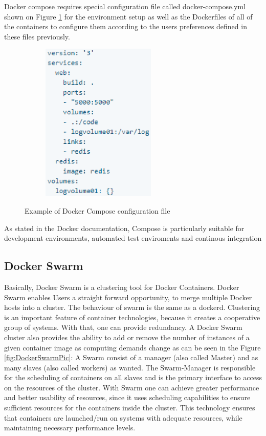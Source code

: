 Docker compose requires special configuration file called
docker-compose.yml shown on Figure \ref{fig:DockerComposeFilePic}
for the environment setup
as well as the Dockerfiles of all of the
containers to configure them according to the users
preferences defined in these files previously\cite{DockerCompose}.

\begin{figure}
\includegraphics[height=3in, width=3in]{DockerComposeExample}
\caption{Example of Docker Compose configuration file}
\cite{DockerComposeFilePic}
\label{fig:DockerComposeFilePic}
\end{figure}

As stated in the Docker documentation, Compose is particularly suitable
for development environments,
automated test enviroments and continous integration

\subsection{Docker Swarm}

Basically, Docker Swarm is a clustering tool for Docker Containers.
Docker Swarm enables Users a straight forward opportunity,
to merge multiple Docker hosts into a cluster\cite{DockerSwarmDefinition}.
The behaviour of swarm is the same as a dockerd.
Clustering is an important feature of container technologies,
because it creates a cooperative group of systems.
With that, one can provide redundancy.
A Docker Swarm cluster also provides the
ability to add or remove the number of instances of a given container
image as computing demands change
as can be seen in the Figure \ref{fig:DockerSwarmPic}:
A Swarm consist of a manager (also called Master) and
as many slaves (also called workers) as wanted.
The Swarm-Manager is responsible for the scheduling
of containers on all slaves and is the primary
interface to access on the resources of the cluster\cite{DockerSwarmKeyConcepts}.
With Swarm one can achieve greater performance and
better usability of resources, since it uses
scheduling capabilities to ensure sufficient resources for
the containers inside the cluster. This technology ensures that containers
are launched/run on systems with adequate resources, while maintaining
necessary performance levels\cite{DockerSwarmHowNodesWork}.

